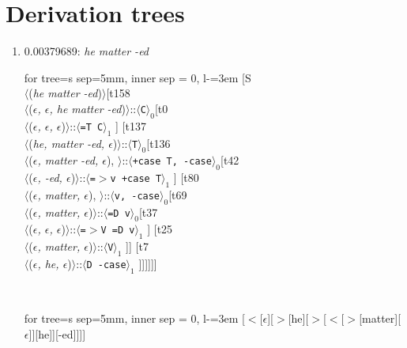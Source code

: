 \documentclass[11pt]{article}
\begin{document}
\section{Derivation trees}
\begin{enumerate}
	\item  0.00379689: \textit{he matter -ed} \\[0.5em]
	\begin{adjustbox}{max width = \textwidth}
	\begin{forest}
	for tree={s sep=5mm, inner sep = 0, l-=3em}
	[S\\$\langle$(\textit{he matter -ed})$\rangle$[t158\\$\langle$(\textit{$\epsilon${,} $\epsilon${,} he matter -ed})$\rangle$::$\langle$\texttt{C}$\rangle_0$[t0\\$\langle$(\textit{$\epsilon${,} $\epsilon${,} $\epsilon$})$\rangle$::$\langle$\texttt{{=}T C}$\rangle_1$ ] [t137\\$\langle$(\textit{he{,} matter -ed{,} $\epsilon$})$\rangle$::$\langle$\texttt{T}$\rangle_0$[t136\\$\langle$(\textit{$\epsilon${,} matter -ed{,} $\epsilon$}){,} $\rangle$::$\langle$\texttt{+case T{,} -case}$\rangle_0$[t42\\$\langle$(\textit{$\epsilon${,} -ed{,} $\epsilon$})$\rangle$::$\langle$\texttt{{=}$>$v +case T}$\rangle_1$ ] [t80\\$\langle$(\textit{$\epsilon${,} matter{,} $\epsilon$}){,} $\rangle$::$\langle$\texttt{v{,} -case}$\rangle_0$[t69\\$\langle$(\textit{$\epsilon${,} matter{,} $\epsilon$})$\rangle$::$\langle$\texttt{{=}D v}$\rangle_0$[t37\\$\langle$(\textit{$\epsilon${,} $\epsilon${,} $\epsilon$})$\rangle$::$\langle$\texttt{{=}$>$V {=}D v}$\rangle_1$ ] [t25\\$\langle$(\textit{$\epsilon${,} matter{,} $\epsilon$})$\rangle$::$\langle$\texttt{V}$\rangle_1$ ]] [t7\\$\langle$(\textit{$\epsilon${,} he{,} $\epsilon$})$\rangle$::$\langle$\texttt{D -case}$\rangle_1$ ]]]]]]
	\end{forest}
	\end{adjustbox}
	\\
	\begin{adjustbox}{max width = \textwidth}
	\begin{forest}
	for tree={s sep=5mm, inner sep = 0, l-=3em}
	[$<$[$\epsilon$][$>$[he][$>$[$<$[$>$[matter][$\epsilon$]][he]][-ed]]]]
	\end{forest}
	\end{adjustbox}
	\newpage


\end{enumerate}
\end{document}
